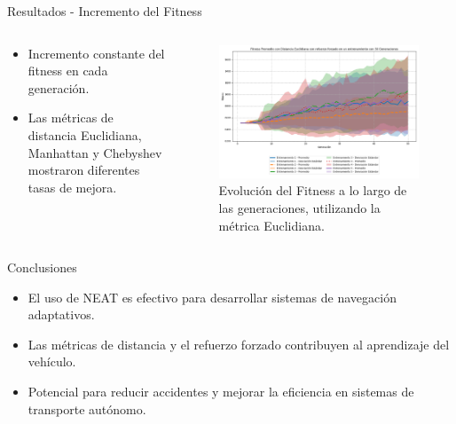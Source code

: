\documentclass{beamer}
\begin{document}
\begin{frame}{Resultados - Incremento del Fitness}
    \begin{columns}[T]
        \begin{column}{0.6\textwidth}
            \begin{itemize}
                \item Incremento constante del fitness en cada generación.
                \item Las métricas de distancia Euclidiana, Manhattan y Chebyshev mostraron diferentes tasas de mejora.
            \end{itemize}
            
        \end{column}
        \begin{column}{0.5\textwidth}
            \begin{figure}
                \centering
                \includegraphics[width=\linewidth]{Euclidiana/Fitness_Acumulado_Eucli_50Gen.png}
                \caption{Evolución del Fitness a lo largo de las generaciones, utilizando la métrica Euclidiana.}
            \end{figure}
        \end{column}
    \end{columns}
\end{frame}



\begin{frame}{Conclusiones}
    \begin{itemize}
        \item El uso de NEAT es efectivo para desarrollar sistemas de navegación adaptativos.
        \item Las métricas de distancia y el refuerzo forzado contribuyen al aprendizaje del vehículo.
        \item Potencial para reducir accidentes y mejorar la eficiencia en sistemas de transporte autónomo.
    \end{itemize}
\end{frame}
\end{document}
